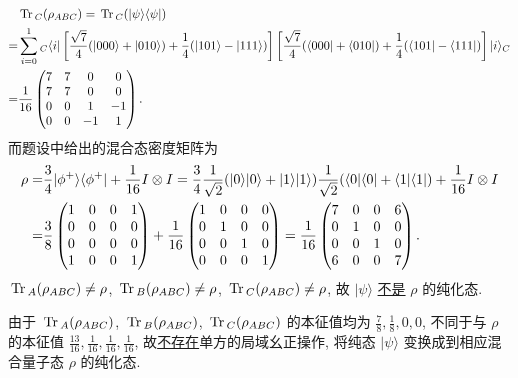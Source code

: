 \documentclass{assignment}
\begin{document}
\begin{sol}
\begin{itemize}
\begin{align}
            \notag&\,\mathrm{Tr}\,_C(\rho_{ABC})=\,\mathrm{Tr}\,_C(\lvert\psi\rangle\langle\psi\rvert)\\
            \notag=&\sum_{i=0}^1{}_C\langle i\rvert\left[\frac{\sqrt{7}}{4}(\lvert 000\rangle+\lvert 010\rangle)+\frac{1}{4}(\lvert 101\rangle-\lvert 111\rangle)\right]\left[\frac{\sqrt{7}}{4}(\langle 000\rvert+\langle 010\rvert)+\frac{1}{4}(\langle 101\rvert-\langle 111\rvert)\right]\lvert i\rangle_C\\
            =&\frac{1}{16}\begin{pmatrix}
                7&7&0&0\\
                7&7&0&0\\
                0&0&1&-1\\
                0&0&-1&1
            \end{pmatrix}.
        \end{align}
        而题设中给出的混合态密度矩阵为
        \begin{align}
            \notag\rho=&\frac{3}{4}\lvert\phi^+\rangle\langle\phi^+\rvert+\frac{1}{16}I\otimes I=\frac{3}{4}\frac{1}{\sqrt{2}}(\lvert 0\rangle\lvert 0\rangle+\lvert 1\rangle\lvert 1\rangle)\frac{1}{\sqrt{2}}(\langle 0\rvert\langle 0\rvert+\langle 1\rvert\langle 1\rvert)+\frac{1}{16}I\otimes I\\
            =&\frac{3}{8}\begin{pmatrix}
                1&0&0&1\\
                0&0&0&0\\
                0&0&0&0\\
                1&0&0&1
            \end{pmatrix}+\frac{1}{16}\begin{pmatrix}
                1&0&0&0\\
                0&1&0&0\\
                0&0&1&0\\
                0&0&0&1
            \end{pmatrix}=\frac{1}{16}\begin{pmatrix}
                7&0&0&6\\
                0&1&0&0\\
                0&0&1&0\\
                6&0&0&7
            \end{pmatrix}.
        \end{align}
        $\,\mathrm{Tr}\,_A(\rho_{ABC})\neq\rho$, $\,\mathrm{Tr}\,_B(\rho_{ABC})\neq\rho$, $\,\mathrm{Tr}\,_C(\rho_{ABC})\neq\rho$, 故 $\lvert\psi\rangle$ \uline{不是} $\rho$ 的纯化态.

        由于 $\,\mathrm{Tr}\,_A(\rho_{ABC})$, $\,\mathrm{Tr}\,_B(\rho_{ABC})$, $\,\mathrm{Tr}\,_C(\rho_{ABC})$ 的本征值均为 $\frac{7}{8},\frac{1}{8},0,0$, 不同于与 $\rho$ 的本征值 $\frac{13}{16},\frac{1}{16},\frac{1}{16},\frac{1}{16}$, 故\uline{不存在}单方的局域幺正操作, 将纯态 $\lvert\psi\rangle$ 变换成到相应混合量子态 $\rho$ 的纯化态.
    \end{itemize}
\end{sol}
\end{document}
